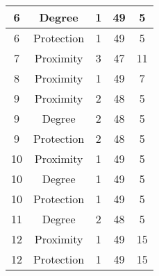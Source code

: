\documentclass[results.tex]{subfiles}
\begin{document}
\begin{center}
\begin{tabular}{| c || c | c | c | c |}
            \hline
            6                       & Degree                       & 1                      & 49                      & 5                    \\
            \hline
            6                       & Protection                   & 1                      & 49                      & 5                    \\
            \hline
            7                       & Proximity                    & 3                      & 47                      & 11                   \\
            \hline
            8                       & Proximity                    & 1                      & 49                      & 7                    \\
            \hline
            9                       & Proximity                    & 2                      & 48                      & 5                    \\
            \hline
            9                       & Degree                       & 2                      & 48                      & 5                    \\
            \hline
            9                       & Protection                   & 2                      & 48                      & 5                    \\
            \hline
            10                      & Proximity                    & 1                      & 49                      & 5                    \\
            \hline
            10                      & Degree                       & 1                      & 49                      & 5                    \\
            \hline
            10                      & Protection                   & 1                      & 49                      & 5                    \\
            \hline
            11                      & Degree                       & 2                      & 48                      & 5                    \\
            \hline
            12                      & Proximity                    & 1                      & 49                      & 15                   \\
            \hline
            12                      & Protection                   & 1                      & 49                      & 15                   \\

\end{tabular}
\end{center}
\end{document}
